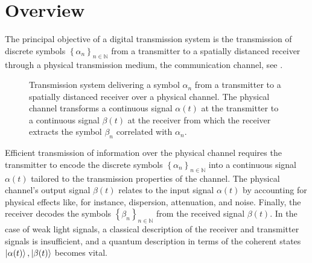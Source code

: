 \section{Overview}

The principal objective of a digital transmission system is the transmission of discrete symbols $\left\{\alpha_n\right\}_{n\in\mathbb{N}}$ from a transmitter to a spatially distanced receiver through a physical transmission medium, the communication channel, see .
\begin{figure}[htb]
	\centering
	
	\caption{Transmission system delivering a symbol $\alpha_n$ from a transmitter to a spatially distanced receiver over a physical channel. The physical channel transforms a continuous signal $\alpha(t)$ at the transmitter to a continuous signal $\beta(t)$ at the receiver from which the receiver extracts the symbol $\beta_n$ correlated with $\alpha_n$.}\label{fig:transmission_system}
\end{figure}
Efficient transmission of information over the physical channel requires the transmitter to encode the discrete symbols $\left\{\alpha_n\right\}_{n\in\mathbb{N}}$ into a continuous signal $\alpha(t)$ tailored to the transmission properties of the channel.
The physical channel's output signal $\beta(t)$ relates to the input signal $\alpha(t)$ by accounting for physical effects like, for instance, dispersion, attenuation, and noise.
Finally, the receiver decodes the symbols $\left\{\beta_n\right\}_{n\in\mathbb{N}}$ from the received signal $\beta(t)$.
In the case of weak light signals, a classical description of the receiver and transmitter signals is insufficient, and a quantum description in terms of the coherent states $\ket{\alpha(t)},\ket{\beta(t)}$ becomes vital.